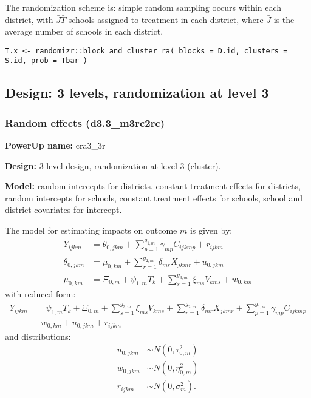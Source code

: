 \documentclass[12pt]{article}
\begin{document}
The randomization scheme is: simple random sampling occurs within each district, with $\bar{J} \bar{T}$ schools assigned to treatment in each district, where $\bar{J}$ is the average number of schools in each district.
\begin{verbatim}
T.x <- randomizr::block_and_cluster_ra( blocks = D.id, clusters = S.id, prob = Tbar )
\end{verbatim}



\newpage 
\subsection{Design: 3 levels, randomization at level 3}


\subsubsection{Random effects (d3.3\_m3rc2rc)}

\textbf{PowerUp name:} cra3\_3r

\textbf{Design:} 3-level design, randomization at level 3 (cluster).

\textbf{Model:} random intercepts for districts, constant treatment effects for districts, random intercepts for schools, constant treatment effects for schools, school and district covariates for intercept.

The model for estimating impacts on outcome $m$ is given by:
\begin{align}\label{eqn:bi12c_model}
Y_{ijkm} &=  \theta_{0,jkm} + \sum_{p=1}^{g_{1,m}} \gamma_{mp} C_{ijkmp} + r_{ijkm}\\
\nonumber \theta_{0,jkm} &= \mu_{0,km} + \sum_{r=1}^{g_{2,m}} \delta_{mr} X_{jkmr} + u_{0,jkm}\\
\nonumber \mu_{0,km}  &= \Xi_{0,m} + \psi_{1,m} T_{k} + \sum_{s=1}^{g_{3,m}} \xi_{ms} V_{kms} + w_{0,km}
\end{align}
with reduced form:
\begin{align}
Y_{ijkm} &= \psi_{1,m} T_{k} + \Xi_{0,m} + \sum_{s=1}^{g_{3,m}} \xi_{ms} V_{kms} + \sum_{r=1}^{g_{2,m}} \delta_{mr} X_{jkmr} + \sum_{p=1}^{g_{1,m}} \gamma_{mp} C_{ijkmp}\\
\nonumber &+ w_{0,km} + u_{0,jkm} + r_{ijkm}
\end{align}
and distributions:
\begin{align}
u_{0,jkm} &\sim N\left(0, \tau^2_{0,m}\right)\\
\nonumber w_{0,jkm} &\sim N\left(0, \eta^2_{0,m}\right)\\
\nonumber r_{ijkm} &\sim N\left(0, \sigma^2_m\right).
\end{align}
\end{document}
